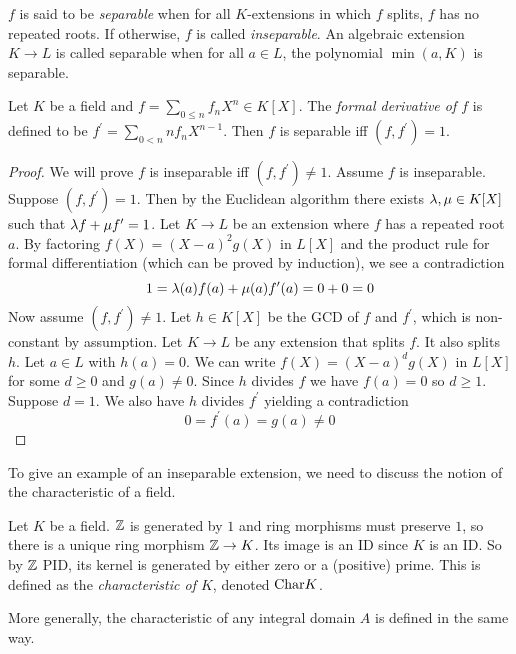 \documentclass{article}
\begin{document}
\begin{dfn} 

  $f$ is said to be \emph{separable} when 
  for all $K$-extensions in which $f$ splits, $f$ has no repeated roots. 
  If otherwise, $f$ is called \emph{inseparable}. 
  An algebraic extension $K \to L$ is called 
  separable when for all $a \in L$,
  the polynomial $\min(a , K)$ is separable.
\end{dfn}

\begin{prop}
  
  Let $K$ be a field and $f = \sum_{0 \leq n} f_n X^n \in K[X]$. 
  The \emph{formal derivative of $f$} is defined to be 
  $f^\prime = \sum_{0 < n} n f_n X^{n-1}$. 
  Then $f$ is separable iff $(f , f^\prime) = 1$.
\end{prop}
\begin{proof}
  We will prove $f$ is inseparable iff $(f , f^\prime) \neq 1$.
  Assume $f$ is inseparable.
  Suppose $(f , f^\prime) = 1$.
  Then by the Euclidean algorithm there exists
  $\lambda, \mu \in K[X]$ such that $\lambda f + \mu f^\prime = 1$.
  Let $K \to L$ be an extension where $f$ has a repeated root $a$.
  By factoring $f(X) = (X - a)^2 g(X)$ in $L[X]$ and the product rule
  for formal differentiation (which can be proved by induction),
  we see a contradiction \[
    1 = \lambda(a) f(a) + \mu(a) f^\prime(a) = 0 + 0 = 0
  \]
  Now assume $(f , f^\prime) \neq 1$.
  Let $h \in K[X]$ be the GCD of $f$ and $f^\prime$,
  which is non-constant by assumption.
  Let $K \to L$ be any extension that splits $f$.
  It also splits $h$.
  Let $a \in L$ with $h(a) = 0$.
  We can write $f(X) = (X - a)^d g(X)$ in $L[X]$ for some $d \geq 0$
  and $g(a) \neq 0$.
  Since $h$ divides $f$ we have $f(a) = 0$ so $d \geq 1$.
  Suppose $d = 1$.
  We also have $h$ divides $f^\prime$ yielding a contradiction \[
    0 = f^\prime(a) = g(a) \neq 0
  \]
\end{proof}

To give an example of an inseparable extension,
we need to discuss the notion of the characteristic of a field.

\begin{dfn}  
  
  Let $K$ be a field. 
  $\mathbb{Z}$ is generated by $1$ and ring morphisms must preserve $1$, 
  so there is a unique ring morphism $\mathbb{Z} \to K$.
  Its image is an ID since $K$ is an ID.
  So by $\mathbb{Z}$ PID, its kernel is generated by either zero or a (positive) prime. 
  This is defined as the \emph{characteristic of $K$},
  denoted $\mathrm{Char}K$.

  More generally, the characteristic of any integral domain $A$
  is defined in the same way.
\end{dfn}
\end{document}
